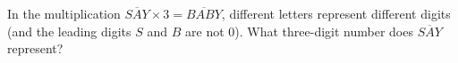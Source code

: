 In the multiplication $\overline{SAY}\times3=\overline{BABY}$, different letters represent different digits (and the leading digits $S$ and $B$ are not $0$). What three-digit number does $\overline{SAY}$ represent?
